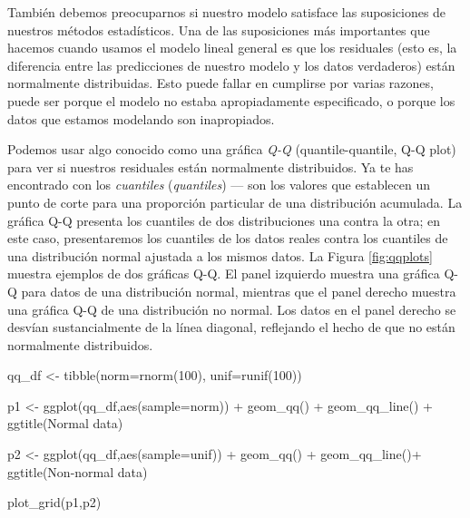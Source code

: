 \documentclass[
  12pt,
]{book}
\newenvironment{Shaded}{\begin{snugshade}}{\end{snugshade}}
\newcommand{\AttributeTok}[1]{\textcolor[rgb]{0.77,0.63,0.00}{#1}}
\newcommand{\DecValTok}[1]{\textcolor[rgb]{0.00,0.00,0.81}{#1}}
\newcommand{\FunctionTok}[1]{\textcolor[rgb]{0.00,0.00,0.00}{#1}}
\newcommand{\NormalTok}[1]{#1}
\newcommand{\OtherTok}[1]{\textcolor[rgb]{0.56,0.35,0.01}{#1}}
\newcommand{\SpecialCharTok}[1]{\textcolor[rgb]{0.00,0.00,0.00}{#1}}
\newcommand{\StringTok}[1]{\textcolor[rgb]{0.31,0.60,0.02}{#1}}
\begin{document}
También debemos preocuparnos si nuestro modelo satisface las suposiciones de nuestros métodos estadísticos. Una de las suposiciones más importantes que hacemos cuando usamos el modelo lineal general es que los residuales (esto es, la diferencia entre las predicciones de nuestro modelo y los datos verdaderos) están normalmente distribuidas. Esto puede fallar en cumplirse por varias razones, puede ser porque el modelo no estaba apropiadamente especificado, o porque los datos que estamos modelando son inapropiados.

Podemos usar algo conocido como una gráfica \emph{Q-Q} (quantile-quantile, Q-Q plot) para ver si nuestros residuales están normalmente distribuidos. Ya te has encontrado con los \emph{cuantiles} (\emph{quantiles}) --- son los valores que establecen un punto de corte para una proporción particular de una distribución acumulada. La gráfica Q-Q presenta los cuantiles de dos distribuciones una contra la otra; en este caso, presentaremos los cuantiles de los datos reales contra los cuantiles de una distribución normal ajustada a los mismos datos. La Figura \ref{fig:qqplots} muestra ejemplos de dos gráficas Q-Q. El panel izquierdo muestra una gráfica Q-Q para datos de una distribución normal, mientras que el panel derecho muestra una gráfica Q-Q de una distribución no normal. Los datos en el panel derecho se desvían sustancialmente de la línea diagonal, reflejando el hecho de que no están normalmente distribuidos.

\begin{Shaded}
\begin{Highlighting}[]
\NormalTok{qq\_df }\OtherTok{\textless{}{-}} \FunctionTok{tibble}\NormalTok{(}\AttributeTok{norm=}\FunctionTok{rnorm}\NormalTok{(}\DecValTok{100}\NormalTok{),}
                \AttributeTok{unif=}\FunctionTok{runif}\NormalTok{(}\DecValTok{100}\NormalTok{))}

\NormalTok{p1 }\OtherTok{\textless{}{-}} \FunctionTok{ggplot}\NormalTok{(qq\_df,}\FunctionTok{aes}\NormalTok{(}\AttributeTok{sample=}\NormalTok{norm)) }\SpecialCharTok{+} 
  \FunctionTok{geom\_qq}\NormalTok{() }\SpecialCharTok{+} 
  \FunctionTok{geom\_qq\_line}\NormalTok{() }\SpecialCharTok{+} 
  \FunctionTok{ggtitle}\NormalTok{(}\StringTok{\textquotesingle{}Normal data\textquotesingle{}}\NormalTok{)}

\NormalTok{p2 }\OtherTok{\textless{}{-}} \FunctionTok{ggplot}\NormalTok{(qq\_df,}\FunctionTok{aes}\NormalTok{(}\AttributeTok{sample=}\NormalTok{unif)) }\SpecialCharTok{+} 
  \FunctionTok{geom\_qq}\NormalTok{() }\SpecialCharTok{+} 
  \FunctionTok{geom\_qq\_line}\NormalTok{()}\SpecialCharTok{+} 
  \FunctionTok{ggtitle}\NormalTok{(}\StringTok{\textquotesingle{}Non{-}normal data\textquotesingle{}}\NormalTok{)}

\FunctionTok{plot\_grid}\NormalTok{(p1,p2)}
\end{Highlighting}
\end{Shaded}
\end{document}
